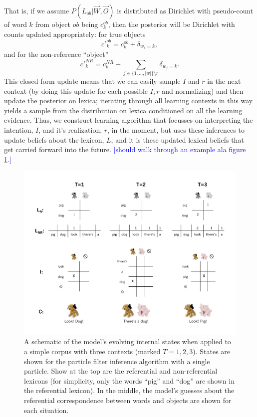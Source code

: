 \documentclass[man,noapacite,12pt]{apa2}
\newcommand{\nnote}[1]{\textcolor{blue}{[#1]}}
\begin{document}
 That is, if we assume $P(L_{ob}|\vec{W},\vec{O})$ is distributed as Dirichlet with pseudo-count of word $k$ from object $ob$ being $c^{ob}_{k}$, then the posterior will be Dirichlet with counts updated appropriately: for true objects
$$
c'^{ob}_{k} = c^{ob}_{k} + \delta_{w_{r}=k},
$$
and for the non-reference ``object''
$$
c'^{NR}_{k} = c^{NR}_{k} + \sum_{j \in \{1,\dots,|w|\} \setminus r} \delta_{w_{j}=k}.
$$
This closed form update means that we can easily sample $I$ and $r$ in the next context (by doing this update for each possible $I,r$ and normalizing) and then update the posterior on lexica; iterating through all learning contexts in this way yields a sample from the distribution on lexica conditioned on all the learning evidence.
%
Thus, we construct learning algorithm that focusses on interpreting the intention, $I$, and it's realization, $r$, in the moment, but uses these inferences to update beliefs about the lexicon, $L$, and it is these updated lexical beliefs that get carried forward into the future. \nnote{should walk through an example ala figure \ref{fig:inference_diagram}.}

\begin{figure}[H]
\begin{center}
\includegraphics[width=6.25in]{figures/inference_diagram.pdf}
\caption{\label{fig:inference_diagram} A schematic of the model's evolving internal states when applied to a simple corpus with three contexts (marked $T=1,2,3$). States are shown for the particle filter inference algorithm with a single particle. Show at the top are the referential and non-referential lexicons (for simplicity, only the words ``pig'' and ``dog'' are shown in the referential lexicon). In the middle, the model's guesses about the referential correspondence between words and objects are shown for each situation.}
\end{center}
\end{figure}
\end{document}
